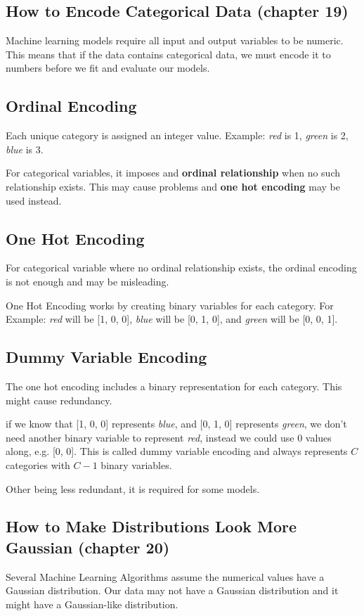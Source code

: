 \documentclass{article}
\begin{document}
\subsection{How to Encode Categorical Data (chapter 19)}
Machine learning models require all input and output variables to be numeric. This means that if the data contains categorical data, we must encode it to numbers before we fit and evaluate our models.

\subsection*{Ordinal Encoding}
Each unique category is assigned an integer value. Example: \textit{red} is 1, \textit{green} is 2, \textit{blue} is 3.

\noindent For categorical variables, it imposes and \textbf{ordinal relationship} when no such relationship exists. This may cause problems and \textbf{one hot encoding} may be used instead.

\subsection*{One Hot Encoding}
For categorical variable where no ordinal relationship exists, the ordinal encoding is not enough and may be misleading.

\noindent One Hot Encoding works by creating binary variables for each category. For Example: \textit{red} will be [1, 0, 0], \textit{blue} will be [0, 1, 0], and \textit{green} will be [0, 0, 1].

\subsection*{Dummy Variable Encoding}
The one hot encoding includes a binary representation for each category. This might cause redundancy. 

\noindent if we know that [1, 0, 0] represents \textit{blue}, and [0, 1, 0] represents \textit{green}, we don't need another binary variable to represent \textit{red}, instead we could use 0 values along, e.g. [0, 0]. This is called dummy variable encoding and always represents $C$ categories with $C-1$ binary variables.

\noindent Other being less redundant, it is required for some models.

\subsection{How to Make Distributions Look More Gaussian (chapter 20)}
Several Machine Learning Algorithms assume the numerical values have a Gaussian distribution. Our data may not have a Gaussian distribution and it might have a Gaussian-like distribution.
\end{document}
